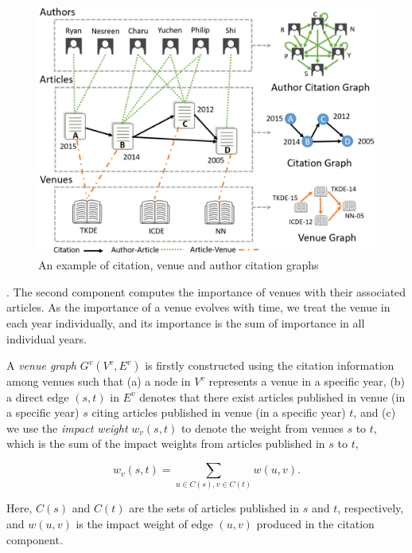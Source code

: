 \begin{figure}[tb!]
\centering
\includegraphics[scale=0.34]{fig/example-graph.eps}
\vspace{-3.3ex}
\caption{\small An example of citation, venue and author citation graphs} \label{fig-example-graph}
\vspace{-3ex}
\end{figure}


.
The second component computes the importance of venues with their associated articles. As the importance of a venue  evolves with time, we treat the venue in each year individually, and its importance is the sum of importance in all individual years.


A {\em venue graph} $G^v(V^v, E^v)$ is firstly constructed using the citation information among venues such that (a) a node in $V^v$ represents a venue in a specific year, (b) a direct edge $(s,t)$ in $E^v$ denotes that there exist articles published in venue (in a specific year) $s$ citing articles published in venue (in a specific year) $t$, and (c) we use the {\em impact weight} $w_v(s,t)$ to denote the weight  from venues $s$ to $t$, which is the sum of the impact weights from articles published in $s$ to $t$, \ie

\vspace{-1ex}
\begin{small}
\begin{equation} \label{eq-infl-weights-v-app}
w_v(s,t)  = \sum_{u\in C(s), v\in C(t)} w(u,v).
\end{equation}
\end{small}
\noindent
Here, $C(s)$ and $C(t)$ are the sets of articles published in $s$ and $t$, respectively, and $w(u,v)$ is the impact weight of edge $(u, v)$ produced in the citation component.

